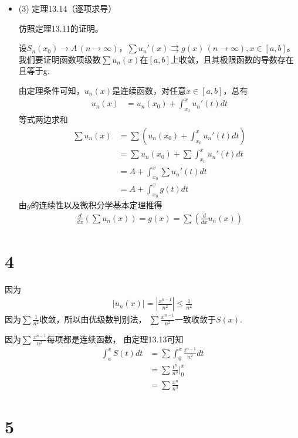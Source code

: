 \documentclass{article}
\begin{document}
\begin{itemize}
  \item (3) 定理13.14（逐项求导）

        仿照定理13.11的证明。

        设$S_n(x_0) \to A \, (n \to \infty)$，$\sum u_n'(x) \rightrightarrows g(x) \, (n \to \infty), x \in [a, b]$。
        我们要证明函数项级数$\sum u_n(x)$在$[a,b]$上收敛，且其极限函数的导数存在且等于g.

        由定理条件可知，$u_n(x)$是连续函数，对任意$x \in [a, b]$，总有
        \begin{align*}
          u_n(x)
           & = u_n(x_0) + \int_{x_0}^{x} u_n'(t) dt
        \end{align*}
        等式两边求和
        \begin{align*}
          \sum u_n(x)
           & = \sum \left( u_n(x_0) + \int_{x_0}^{x} u_n'(t) dt \right) \\
           & = \sum u_n(x_0) + \sum \int_{x_0}^{x} u_n'(t) dt           \\
           & = A + \int_{x_0}^{x} \sum u_n'(t) dt                       \\
           & = A + \int_{x_0}^{x} g(t) dt
        \end{align*}
        由$g$的连续性以及微积分学基本定理推得
        \begin{align*}
          \frac{d}{dx} \left(\sum u_n(x)\right) = g(x) = \sum (\frac{d}{dx} u_n(x))
        \end{align*}
\end{itemize}

\section*{4}

因为
\begin{align*}
  |u_n(x)| = |\frac{x^{n-1}}{n^2}| \leq \frac{1}{n^2}
\end{align*}
因为$\sum \frac{1}{n^2}$收敛，所以由优级数判别法，
$\sum \frac{x^{n-1}}{n^2}$一致收敛于$S(x)$.

因为$\sum \frac{x^{n-1}}{n^2}$每项都是连续函数，
由定理13.13可知
\begin{align*}
  \int_{a}^{x} S(t) dt
   & = \sum \int_{0}^{x} \frac{t^{n-1}}{n^2} dt \\
   & = \sum \frac{t^n}{n^3} \bigg|_{0}^{x}      \\
   & = \sum \frac{x^n}{n^3}
\end{align*}

\section*{5}
\end{document}
